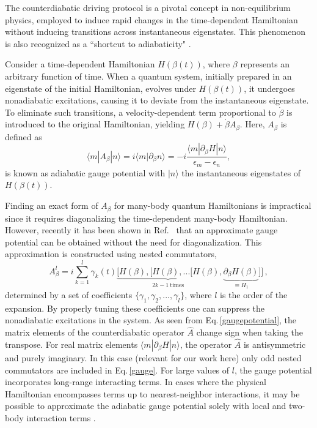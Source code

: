 \documentclass[twocolumn,aps,superscriptaddress,floatfix,longbibliography]{revtex4-2}
\newcommand{\Eq}[1]{Eq.\,\eqref{#1}}
\begin{document}
The counterdiabatic driving protocol is a pivotal concept in
non-equilibrium physics, employed to induce
rapid changes in the time-dependent Hamiltonian without inducing
transitions \cite{demirplak2003adiabatic,sels2017minimizing}
across instantaneous eigenstates.
This phenomenon is also recognized as a ``shortcut to
adiabaticity" \cite{chen2010fast, del2013shortcuts,
guery2019shortcuts,takahashi2019hamiltonian}. 


Consider a time-dependent Hamiltonian $H(\beta(t))$, where
$\beta$ represents an arbitrary function of time. When a quantum system, initially prepared in an eigenstate of the initial Hamiltonian, evolves
under $H(\beta(t))$, it undergoes nonadiabatic excitations,
causing it to deviate from the instantaneous eigenstate. To
eliminate such transitions, a velocity-dependent term
proportional to $\dot{\beta}$ is introduced to the original
Hamiltonian, yielding $H(\beta)+\dot{\beta} A_{\beta}$.
Here, $A_{\beta}$ is defined as
\begin{equation}
\langle m|A_{\beta}|n\rangle=i \langle m|\partial_{\beta} n\rangle=-i\frac{\langle m|\partial_{\beta} H | n\rangle}{\epsilon_{m}-\epsilon_n},
    \label{gaugepotential}
\end{equation}
is known as adiabatic gauge potential
with $|n\rangle$ the instantaneous eigenstates of $H(\beta(t))$.


Finding an exact form of $A_{\beta}$ for many-body quantum
Hamiltonians is impractical since it requires diagonalizing the
time-dependent many-body Hamiltonian. However, recently it has been shown in Ref.~\cite{PolkovnikovPRL2019}
that an approximate gauge potential can be obtained without the
need for diagonalization. This approximation is constructed
using %
nested commutators, %
\begin{equation}
  A_{\beta}^{l}=i\sum_{k=1}^{l} \gamma_{k}(t) \underbrace{[H(\beta),[H(\beta),...[H(\beta)}_{2k-1~{\text{times}}},
  \underbrace{\partial_{\beta} H(\beta)}_{
    \equiv H_1
  }]]
\,, \label{gauge}
\end{equation}
determined by a set of coefficients
$\{\gamma_1,\gamma_2,...,\gamma_l \}$, where $l$ is the order of
the expansion. By properly tuning these coefficients one can suppress the nonadiabatic excitations in the system. 
As seen from \Eq{gaugepotential},
the matrix elements of the counterdiabatic operator
$\hat{A}$ change sign when taking the transpose.
For real matrix elements $\langle m|\partial_{\beta} H | n\rangle$, 
the operator $\hat{A}$ is antisymmetric and purely imaginary.
 In this case (relevant for our work here) only odd nested commutators are \cite{PolkovnikovPRL2019}
included in \Eq{gauge}.
For large values of $l$, the gauge
potential incorporates long-range interacting terms. In cases
where the physical Hamiltonian encompasses terms up to
nearest-neighbor interactions, it may be possible %
to approximate the
adiabatic gauge potential solely with local and two-body
interaction terms \cite{vcepaite2023counterdiabatic}.
\end{document}
